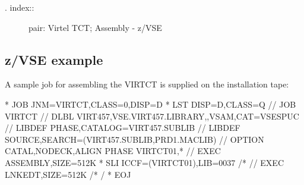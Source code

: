 \documentclass[letterpaper,10pt,english]{sphinxmanual}
\begin{document}
\begin{sphinxVerbatim}[commandchars=\\\{\}]
 
  
  
  
  
  
 
  
\end{sphinxVerbatim}

\begin{description}
\item[{. index::}] \leavevmode
pair: Virtel TCT; Assembly - z/VSE

\end{description}


\subsection{z/VSE example}
\label{\detokenize{Installation_Guide:z-vse-example}}
A sample job for assembling the VIRTCT is supplied on the installation tape:

\begin{sphinxVerbatim}[commandchars=\\\{\}]
* \PYGZdl{}\PYGZdl{} JOB JNM=VIRTCT,CLASS=0,DISP=D
* \PYGZdl{}\PYGZdl{} LST DISP=D,CLASS=Q
// JOB VIRTCT
// DLBL VIRT457,\PYGZsq{}VSE.VIRT457.LIBRARY\PYGZsq{},,VSAM,CAT=VSESPUC
// LIBDEF PHASE,CATALOG=VIRT457.SUBLIB
// LIBDEF SOURCE,SEARCH=(VIRT457.SUBLIB,PRD1.MACLIB)
// OPTION CATAL,NODECK,ALIGN
        PHASE VIRTCT01,*
// EXEC ASSEMBLY,SIZE=512K
* \PYGZdl{}\PYGZdl{} SLI ICCF=(VIRTCT01),LIB=0037
/*
// EXEC LNKEDT,SIZE=512K
/*
/\PYGZam{}
* \PYGZdl{}\PYGZdl{} EOJ
\end{sphinxVerbatim}
\end{document}
